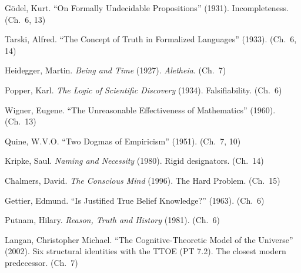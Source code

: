 \documentclass[10pt, openany, oneside]{book}
\begin{document}
{\begin{english}
\vspace{0.3em}

\noindent G\"{o}del, Kurt. ``On Formally Undecidable Propositions'' (1931). Incompleteness. (Ch.\ 6, 13)

\vspace{0.3em}

\noindent Tarski, Alfred. ``The Concept of Truth in Formalized Languages'' (1933). (Ch.\ 6, 14)

\vspace{0.3em}

\noindent Heidegger, Martin. \textit{Being and Time} (1927). \textit{Aletheia}. (Ch.\ 7)

\vspace{0.3em}

\noindent Popper, Karl. \textit{The Logic of Scientific Discovery} (1934). Falsifiability. (Ch.\ 6)

\vspace{0.3em}

\noindent Wigner, Eugene. ``The Unreasonable Effectiveness of Mathematics'' (1960). (Ch.\ 13)

\vspace{0.3em}

\noindent Quine, W.V.O. ``Two Dogmas of Empiricism'' (1951). (Ch.\ 7, 10)

\vspace{0.3em}

\noindent Kripke, Saul. \textit{Naming and Necessity} (1980). Rigid designators. (Ch.\ 14)

\vspace{0.3em}

\noindent Chalmers, David. \textit{The Conscious Mind} (1996). The Hard Problem. (Ch.\ 15)

\vspace{0.3em}

\noindent Gettier, Edmund. ``Is Justified True Belief Knowledge?'' (1963). (Ch.\ 6)

\vspace{0.3em}

\noindent Putnam, Hilary. \textit{Reason, Truth and History} (1981). (Ch.\ 6)

\vspace{0.3em}

\noindent Langan, Christopher Michael. ``The Cognitive-Theoretic Model of the Universe'' (2002). Six structural identities with the TTOE (PT 7.2). The closest modern predecessor. (Ch.\ 7)
\end{english}

}
\end{document}
